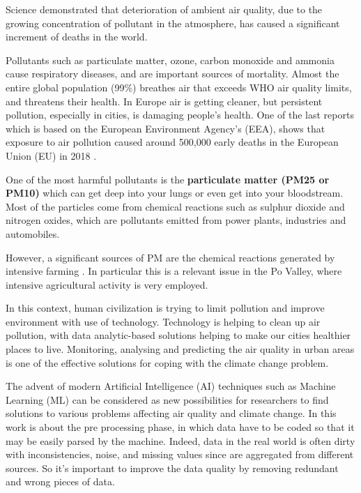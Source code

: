 Science demonstrated that deterioration of ambient air quality, due to the growing concentration of pollutant in the atmosphere, has caused a significant increment of deaths in the world.\par  
Pollutants such as particulate matter, ozone, carbon monoxide and ammonia cause respiratory diseases, and are important sources of mortality.
Almost the entire global population (99\%) breathes air that exceeds WHO air quality limits, and threatens their health.\newline
In Europe air is getting cleaner, but persistent pollution, especially in cities, is damaging people’s health. One of the last reports which is based on the European Environment Agency’s (EEA), shows that exposure to air pollution caused around 500,000 early deaths in the European Union (EU) in 2018 \cite{european2018air}.\par
One of the most harmful pollutants is the \textbf{particulate matter (PM25 or PM10)} which can get deep into your lungs or even get into your bloodstream.\newline
Most of the particles come from chemical reactions such as sulphur dioxide and nitrogen oxides, which are pollutants emitted from power plants, industries and automobiles.\par
However, a significant sources of PM are the chemical reactions generated by intensive farming \cite{burkart2007diffuse}.
In particular this is a relevant issue in the Po Valley, where intensive agricultural activity is very employed.\par
In this context, human civilization is trying to limit pollution and improve environment with use of technology.\newline
Technology is helping to clean up air pollution, with data analytic-based solutions helping to make our cities healthier places to live.\newline
Monitoring, analysing and predicting the air quality in urban areas is one of the effective solutions for coping with the climate change problem.\par
The advent of modern Artificial Intelligence (AI) techniques such as Machine Learning (ML) can be considered as new possibilities for researchers to find solutions to various problems affecting air quality and climate change.
\bigskip
In this work is about the pre processing phase, in which data have to be coded so that it may be easily parsed by the machine. 
Indeed, data in the real world is often dirty with inconsistencies, noise, and missing values since are aggregated from different sources. So it's important to improve the data quality by removing redundant and wrong pieces of data.
